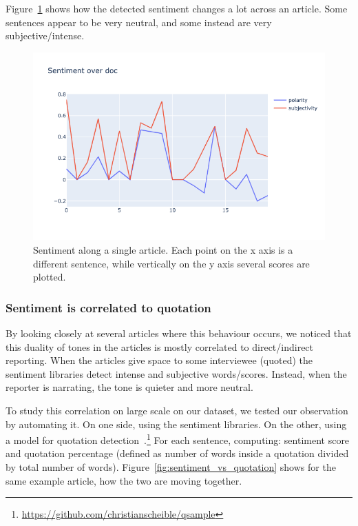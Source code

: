 Figure~\ref{fig:sentiment_across_one_article} shows how the detected sentiment changes a lot across an article.
Some sentences appear to be very neutral, and some instead are very subjective/intense.

\begin{figure}[!htbp]
    \centering
    \includegraphics[width=\linewidth]{figures/sentiment_across_article.png}
    \caption{Sentiment along a single article. Each point on the x axis is a different sentence, while vertically on the y axis several scores are plotted.}
    \label{fig:sentiment_across_one_article}
\end{figure}

\subsubsection{Sentiment is correlated to quotation}
By looking closely at several articles where this behaviour occurs, we noticed that this duality of tones in the articles is mostly correlated to direct/indirect reporting. When the articles give space to some interviewee (quoted) the sentiment libraries detect intense and subjective words/scores. Instead, when the reporter is narrating, the tone is quieter and more neutral.

To study this correlation on large scale on our dataset, we tested our observation by automating it.
On one side, using the sentiment libraries. On the other, using a model for quotation detection~\citep{scheible2016model}.\footnote{\url{https://github.com/christianscheible/qsample}}
For each sentence, computing: sentiment score and quotation percentage (defined as number of words inside a quotation divided by total number of words).
Figure~\ref{fig:sentiment_vs_quotation} shows for the same example article, how the two are moving together.

